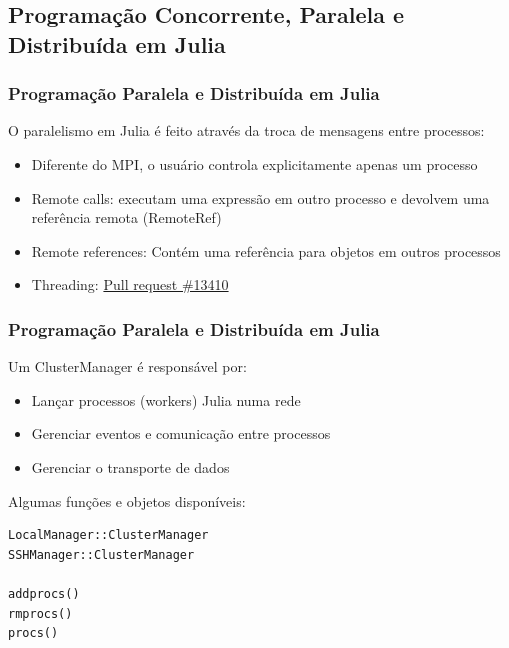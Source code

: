 \documentclass[10pt, compress]{beamer}
\begin{document}
\subsection{Programação Concorrente, Paralela e Distribuída em Julia}

\begin{frame}[fragile]
    \frametitle{Programação Paralela e Distribuída em Julia}
    O paralelismo em Julia é feito através da troca de mensagens
    entre processos:
    \begin{itemize}
        \item Diferente do MPI, o usuário controla
            explicitamente \alert{apenas um processo}
            \pause
        \item \alert{Remote calls}: executam uma \alert{expressão} em
            outro processo e devolvem uma referência remota (\alert{RemoteRef})
        \item \alert{Remote references}: Contém uma referência para objetos
            em \alert{outros processos}
            \pause
        \item \alert{Threading}: \href{https://github.com/JuliaLang/julia/pull/13410}{Pull request \#13410}
    \end{itemize}
    \let\thefootnote\relax{}
    \let\thefootnote\relax{}
\end{frame}

\begin{frame}[fragile]
    \frametitle{Programação Paralela e Distribuída em Julia}
    Um \alert{ClusterManager} é responsável por:
    \begin{itemize}
        \item Lançar processos (\alert{workers}) Julia numa rede
        \item Gerenciar \alert{eventos} e \alert{comunicação}
            entre processos
        \item Gerenciar o \alert{transporte} de dados
    \end{itemize}
    \pause
    Algumas funções e objetos disponíveis:
    \begin{lstlisting}
LocalManager::ClusterManager
SSHManager::ClusterManager

addprocs()
rmprocs()
procs()
    \end{lstlisting}
    \let\thefootnote\relax{}
    \let\thefootnote\relax{}
\end{frame}
\end{document}
